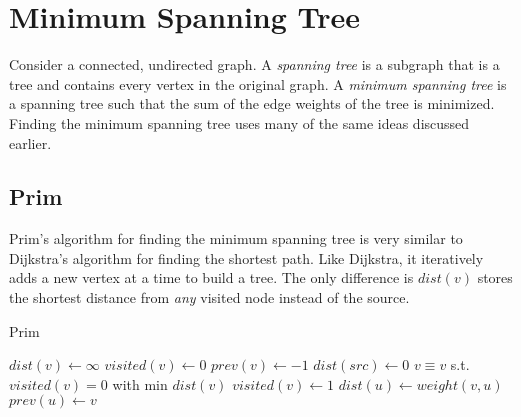 \section{Minimum Spanning Tree}

Consider a connected, undirected graph. A \textit{spanning tree} is a subgraph that is a tree and contains every vertex in the original graph. A \textit{minimum spanning tree} is a spanning tree such that the sum of the edge weights of the tree is minimized. Finding the minimum spanning tree uses many of the same ideas discussed earlier.

\begin{center}
\end{center}

\subsection{Prim}

Prim's algorithm for finding the minimum spanning tree is very similar to Dijkstra's algorithm for finding the shortest path. Like Dijkstra, it iteratively adds a new vertex at a time to build a tree. The only difference is $dist(v)$ stores the shortest distance from \textit{any} visited node instead of the source.

\begin{algorithm}[H]
\caption{Prim}
\begin{algorithmic}
	\State $dist(v) \gets \infty$
	\State $visited(v) \gets 0$
    \State $prev(v) \gets -1$
\EndFor
\State $dist(src) \gets 0$
	\State $v \equiv v$ s.t. $visited(v)=0$ with min $dist(v)$
    \State $visited(v) \gets 1$
				\State $dist(u) \gets weight(v, u)$
   	        	\State $prev(u) \gets v$
			\EndIf
        \EndIf
    \EndFor
\EndWhile
\end{algorithmic}
\end{algorithm}

